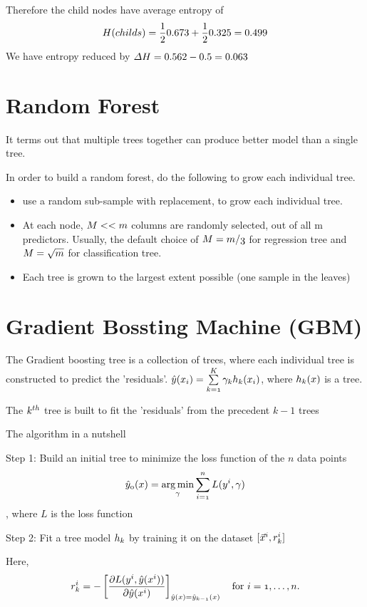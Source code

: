 \documentclass[12pt, oneside]{article}
\begin{document}
Therefore the child nodes have average entropy of 
$$
\mathnormal{H(childs)}=\frac{1}{2} 0.673+\frac{1}{2} 0.325=0.499
$$
We have entropy reduced by $\mathnormal{\Delta H}=0.562-0.5=0.063$




\section{Random Forest}

It terms out that multiple trees together can produce better model than a single tree. 

In order to build a random forest, do the following to grow each individual tree.
\begin{itemize}
\item  use a random sub-sample with replacement, to grow each individual tree.
\item  At each node,  $\mathnormal{M<<m}$ columns are randomly selected, out of all m predictors. Usually, the default choice of $\mathnormal{M=m/3}$ for regression tree and $\mathnormal{M=\sqrt{m}}$ for classification tree.
\item Each tree is grown to the largest extent possible (one sample in the leaves)

\end{itemize}

\section{Gradient Bossting Machine (GBM)}

The Gradient boosting tree is a collection of trees, where each individual tree is constructed to predict the 'residuals'.
$\mathnormal{\hat{y}(x_i)=\sum\limits_{k=1}^K \gamma_k h_k(x_i)}$, where $\mathnormal{h_k(x)}$ is a tree. 

The $\mathnormal{k^{th}}$ tree is built to fit the 'residuals' from the precedent ${k-1}$ trees  

The algorithm in a nutshell

Step 1: Build an initial tree to minimize the loss function of the $n$ data points
$$\mathnormal{\hat{y}_0(x) = \underset{\gamma}{\arg\min} \sum_{i=1}^n L(y^i, \gamma)}$$, where $L$ is the loss function

Step 2: Fit a tree model $\mathnormal{h_{k}}$ by training it on the dataset $\mathnormal{[\vec{x}^i, r^{i}_{k}]}$

Here,
$$\mathnormal{r^{i}_{k} = -\left[\frac{\partial L(y^i, {\hat{y}}(x^i))}{\partial \hat{y}(x^i)}\right]_{{\hat{y}}({x})={\hat{y}}_{k-1}(x)} \quad \mbox{for } i=1,\ldots,n.}$$
\end{document}
